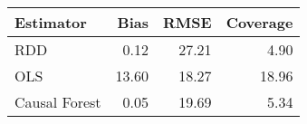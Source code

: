 \begin{table}[ht]
\centering
\begin{tabular}{lrrr}
  \hline
Estimator & Bias & RMSE & Coverage \\ 
  \hline
RDD & 0.12 & 27.21 & 4.90 \\ 
  OLS & 13.60 & 18.27 & 18.96 \\ 
  Causal Forest & 0.05 & 19.69 & 5.34 \\ 
   \hline
\end{tabular}
\caption{} 
\end{table}
